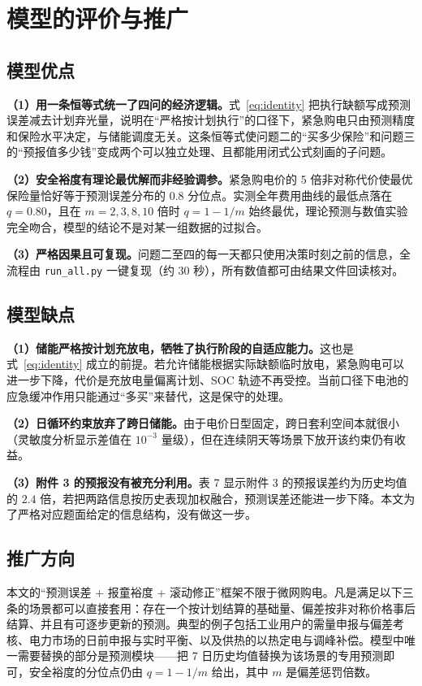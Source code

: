 \section{模型的评价与推广}

\subsection{模型优点}

\textbf{（1）用一条恒等式统一了四问的经济逻辑。}式~\eqref{eq:identity} 把执行缺额写成预测误差减去计划弃光量，说明在“严格按计划执行”的口径下，紧急购电只由预测精度和保险水平决定，与储能调度无关。这条恒等式使问题二的“买多少保险”和问题三的“预报值多少钱”变成两个可以独立处理、且都能用闭式公式刻画的子问题。

\textbf{（2）安全裕度有理论最优解而非经验调参。}紧急购电价的 5 倍非对称代价使最优保险量恰好等于预测误差分布的 $0.8$ 分位点。实测全年费用曲线的最低点落在 $q=0.80$，且在 $m=2,3,8,10$ 倍时 $q=1-1/m$ 始终最优，理论预测与数值实验完全吻合，模型的结论不是对某一组数据的过拟合。

\textbf{（3）严格因果且可复现。}问题二至四的每一天都只使用决策时刻之前的信息，全流程由 \texttt{run\_all.py} 一键复现（约 30 秒），所有数值都可由结果文件回读核对。

\subsection{模型缺点}

\textbf{（1）储能严格按计划充放电，牺牲了执行阶段的自适应能力。}这也是式~\eqref{eq:identity} 成立的前提。若允许储能根据实际缺额临时放电，紧急购电可以进一步下降，代价是充放电量偏离计划、SOC 轨迹不再受控。当前口径下电池的应急缓冲作用只能通过“多买”来替代，这是保守的处理。

\textbf{（2）日循环约束放弃了跨日储能。}由于电价日型固定，跨日套利空间本就很小（灵敏度分析显示差值在 $10^{-3}$ 量级），但在连续阴天等场景下放开该约束仍有收益。

\textbf{（3）附件 3 的预报没有被充分利用。}表 7 显示附件 3 的预报误差约为历史均值的 $2.4$ 倍，若把两路信息按历史表现加权融合，预测误差还能进一步下降。本文为了严格对应题面给定的信息结构，没有做这一步。

\subsection{推广方向}

本文的“预测误差 + 报童裕度 + 滚动修正”框架不限于微网购电。凡是满足以下三条的场景都可以直接套用：存在一个按计划结算的基础量、偏差按非对称价格事后结算、并且有可逐步更新的预测。典型的例子包括工业用户的需量申报与偏差考核、电力市场的日前申报与实时平衡、以及供热的以热定电与调峰补偿。模型中唯一需要替换的部分是预测模块——把 7 日历史均值替换为该场景的专用预测即可，安全裕度的分位点仍由 $q=1-1/m$ 给出，其中 $m$ 是偏差惩罚倍数。
